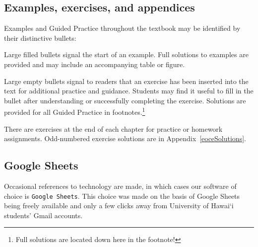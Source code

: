 \subsection*{Examples, exercises, and appendices}

Examples and Guided Practice throughout the textbook may be identified by their distinctive bullets:

\begin{example}{Large filled bullets signal the start of an example.}
Full solutions to examples are provided and may include an accompanying table or figure.
 \end{example}

\begin{exercise}
Large empty bullets signal to readers that an exercise has been inserted into the text for additional practice and guidance. Students may find it useful to fill in the bullet after understanding or successfully completing the exercise. Solutions are provided for all Guided Practice in footnotes.\footnote{Full solutions are located down here in the footnote!}
\end{exercise}

There are exercises at the end of each chapter for practice or homework assignments. Odd-numbered exercise solutions are in Appendix~\ref{eoceSolutions}.

\subsection*{Google Sheets}
Occasional references to technology are made, in which cases our software of choice is \texttt{Google Sheets}. This choice was made on the basis of Google Sheets being freely available and only a few clicks away from University of Hawai\textquoteleft i students' Gmail accounts.




